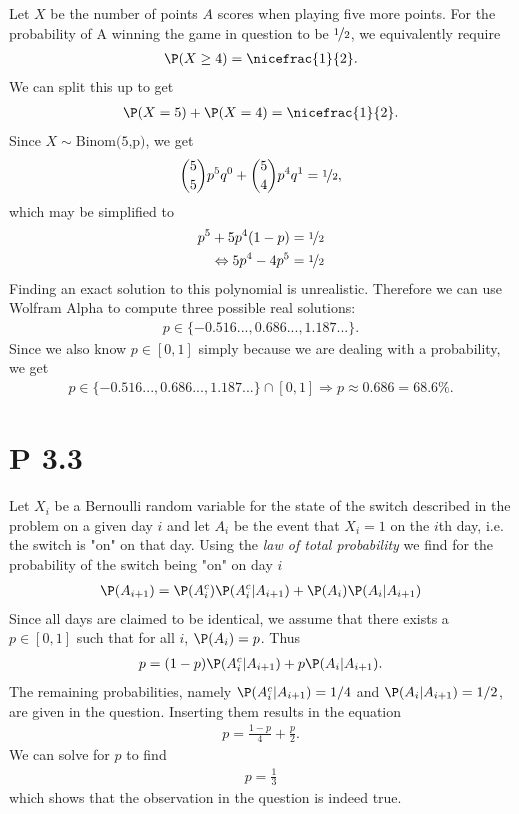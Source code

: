 \documentclass{article}
\begin{document}
Let $X$ be the number of points $A$ scores when playing five more points.
For the probability of A winning the game in question
to be $\nicefrac{1}{2}$, we equivalently require
\begin{align*}
  \P(X\geq 4) = \nicefrac{1}{2}.
\end{align*}
We can split this up to get
\begin{align*}
  \P(X = 5) + \P(X = 4) = \nicefrac{1}{2}.
\end{align*}
Since $X\sim\text{Binom(5,p)}$, we get
\begin{align*}
  \binom{5}{5}p^5q^0+\binom{5}{4}p^4q^1=\nicefrac{1}{2},
\end{align*}
which may be simplified to
\begin{align*}
  p^5+5p^4(1-p)             & = \nicefrac{1}{2} \\
  \Leftrightarrow 5p^4-4p^5 & =\nicefrac{1}{2}
\end{align*}
Finding an exact solution to this polynomial is unrealistic.
Therefore we can use Wolfram Alpha to compute three possible real solutions:
\begin{align*}
  p \in \{-0.516..., 0.686..., 1.187...\}.
\end{align*}
Since we also know $p\in[0,1]$ simply because we are dealing with a
probability, we get
\begin{align*}
  p\in \{-0.516..., 0.686..., 1.187...\} \cap [0,1] \Rightarrow p \approx 0.686=68.6\%.
\end{align*}


\section*{P 3.3}


Let $X_i$ be a Bernoulli random variable for the state of the switch described in the
problem on a given day $i$ and let $A_i$ be the event that $X_i=1$ on the $i$th day,
i.e. the switch is "on" on that day.
Using the \emph{law of total probability} we find for the probability of the switch
being "on" on day $i$
\begin{align*}
  \P(A_{i+1}) = \P(A^c_i)\P(A^c_i | A_{i+1}) + \P(A_i)\P(A_i|A_{i+1})
\end{align*}
Since all days are claimed to be
identical, we assume that there exists a $p\in[0,1]$ such that for all $i$,
$\P(A_i)=p$. Thus
\begin{align*}
  p = (1-p)\P(A^c_i|A_{i+1}) + p\P(A_i|A_{i+1}).
\end{align*}
The remaining probabilities, namely $\P(A^c_i|A_{i+1})=1/4$ and $\P(A_i|A_{i+1})=1/2$,
are given in the question. Inserting them results in the equation
\begin{align*}
  p=\frac{1-p}{4} + \frac{p}{2}.
\end{align*}
We can solve for $p$ to find
\begin{align*}
  p=\frac{1}{3}
\end{align*}
which shows that the observation in the question is indeed true.
\end{document}
